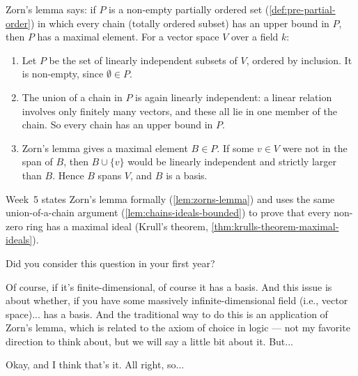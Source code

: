 \begin{aiNote}
Zorn's lemma says: if $P$ is a non-empty partially ordered set (\cref{def:pre-partial-order}) in which every chain (totally ordered subset) has an upper bound in $P$, then $P$ has a maximal element. For a vector space $V$ over a field $k$:
\begin{enumerate}[label=\textbf{(\arabic*)}]
    \item Let $P$ be the set of linearly independent subsets of $V$, ordered by inclusion. It is non-empty, since $\emptyset \in P$.
    \item The union of a chain in $P$ is again linearly independent: a linear relation involves only finitely many vectors, and these all lie in one member of the chain. So every chain has an upper bound in $P$.
    \item Zorn's lemma gives a maximal element $B \in P$. If some $v \in V$ were not in the span of $B$, then $B \cup \{v\}$ would be linearly independent and strictly larger than $B$. Hence $B$ spans $V$, and $B$ is a basis.
\end{enumerate}
Week~5 states Zorn's lemma formally (\cref{lem:zorns-lemma}) and uses the same union-of-a-chain argument (\cref{lem:chains-ideals-bounded}) to prove that every non-zero ring has a maximal ideal (Krull's theorem, \cref{thm:krulls-theorem-maximal-ideals}).
\end{aiNote}

\begin{speech}[00:43:29 - 00:44:01]
Did you consider this question in your first year?

Of course, if it's finite-dimensional, of course it has a basis. And this issue is about whether, if you have some massively infinite-dimensional field (i.e., vector space)... has a basis. And the traditional way to do this is an application of Zorn's lemma, which is related to the axiom of choice in logic --- not my favorite direction to think about, but we will say a little bit about it. But...

Okay, and I think that's it. All right, so... 
\end{speech}

